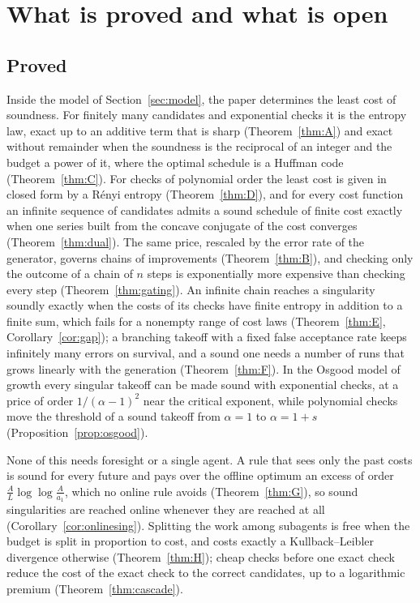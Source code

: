 \section{What is proved and what is open}\label{sec:status}

\subsection{Proved}

Inside the model of Section~\ref{sec:model}, the paper determines the least cost of soundness. For finitely many candidates and exponential checks it is the entropy law, exact up to an additive term that is sharp (Theorem~\ref{thm:A}) and exact without remainder when the soundness is the reciprocal of an integer and the budget a power of it, where the optimal schedule is a Huffman code (Theorem~\ref{thm:C}). For checks of polynomial order the least cost is given in closed form by a R\'enyi entropy (Theorem~\ref{thm:D}), and for every cost function an infinite sequence of candidates admits a sound schedule of finite cost exactly when one series built from the concave conjugate of the cost converges (Theorem~\ref{thm:dual}). The same price, rescaled by the error rate of the generator, governs chains of improvements (Theorem~\ref{thm:B}), and checking only the outcome of a chain of $n$ steps is exponentially more expensive than checking every step (Theorem~\ref{thm:gating}). An infinite chain reaches a singularity soundly exactly when the costs of its checks have finite entropy in addition to a finite sum, which fails for a nonempty range of cost laws (Theorem~\ref{thm:E}, Corollary~\ref{cor:gap}); a branching takeoff with a fixed false acceptance rate keeps infinitely many errors on survival, and a sound one needs a number of runs that grows linearly with the generation (Theorem~\ref{thm:F}). In the Osgood model of growth every singular takeoff can be made sound with exponential checks, at a price of order $1/(\alpha-1)^{2}$ near the critical exponent, while polynomial checks move the threshold of a sound takeoff from $\alpha=1$ to $\alpha=1+s$ (Proposition~\ref{prop:osgood}).

None of this needs foresight or a single agent. A rule that sees only the past costs is sound for every future and pays over the offline optimum an excess of order $\frac{A}{L}\log\log\frac{A}{a_{1}}$, which no online rule avoids (Theorem~\ref{thm:G}), so sound singularities are reached online whenever they are reached at all (Corollary~\ref{cor:onlinesing}). Splitting the work among subagents is free when the budget is split in proportion to cost, and costs exactly a Kullback--Leibler divergence otherwise (Theorem~\ref{thm:H}); cheap checks before one exact check reduce the cost of the exact check to the correct candidates, up to a logarithmic premium (Theorem~\ref{thm:cascade}).

